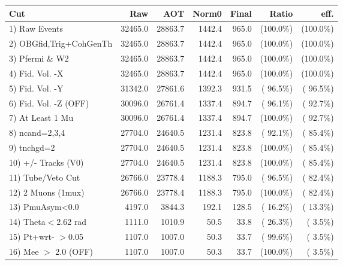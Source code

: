  \begin{table}[h!]\centering
 \begin{tabular}{||l||r|r|r|r|r|r||}
 \hline
 \hline
 Cut & Raw & AOT & Norm0 & Final & Ratio & eff.       \\
 \hline
  1) Raw Events           &      32465.0 &      28863.7 &       1442.4 &        965.0 & (100.0\%) & (100.0\%) \\
  2) OBGfid,Trig+CohGenTh &      32465.0 &      28863.7 &       1442.4 &        965.0 & (100.0\%) & (100.0\%) \\
  3) Pfermi \& W2         &      32465.0 &      28863.7 &       1442.4 &        965.0 & (100.0\%) & (100.0\%) \\
  4) Fid. Vol. -X         &      32465.0 &      28863.7 &       1442.4 &        965.0 & (100.0\%) & (100.0\%) \\
  5) Fid. Vol. -Y         &      31342.0 &      27861.6 &       1392.3 &        931.5 & ( 96.5\%) & ( 96.5\%) \\
  6) Fid. Vol. -Z (OFF)   &      30096.0 &      26761.4 &       1337.4 &        894.7 & ( 96.1\%) & ( 92.7\%) \\
  7) At Least 1 Mu        &      30096.0 &      26761.4 &       1337.4 &        894.7 & (100.0\%) & ( 92.7\%) \\
  8) ncand=2,3,4          &      27704.0 &      24640.5 &       1231.4 &        823.8 & ( 92.1\%) & ( 85.4\%) \\
  9) tnchgd=2             &      27704.0 &      24640.5 &       1231.4 &        823.8 & (100.0\%) & ( 85.4\%) \\
 10) +/- Tracks (V0)      &      27704.0 &      24640.5 &       1231.4 &        823.8 & (100.0\%) & ( 85.4\%) \\
 11) Tube/Veto Cut        &      26766.0 &      23778.4 &       1188.3 &        795.0 & ( 96.5\%) & ( 82.4\%) \\
 12) 2 Muons (1mux)       &      26766.0 &      23778.4 &       1188.3 &        795.0 & (100.0\%) & ( 82.4\%) \\
 13) PmuAsym<0.0          &       4197.0 &       3844.3 &        192.1 &        128.5 & ( 16.2\%) & ( 13.3\%) \\
 14) Theta$<$2.62 rad     &       1111.0 &       1010.9 &         50.5 &         33.8 & ( 26.3\%) & (  3.5\%) \\
 15) Pt+wrt- $>$0.05      &       1107.0 &       1007.0 &         50.3 &         33.7 & ( 99.6\%) & (  3.5\%) \\
 16) Mee $>$ 2.0  (OFF)   &       1107.0 &       1007.0 &         50.3 &         33.7 & (100.0\%) & (  3.5\%) \\

\end{tabular}
\end{table}
